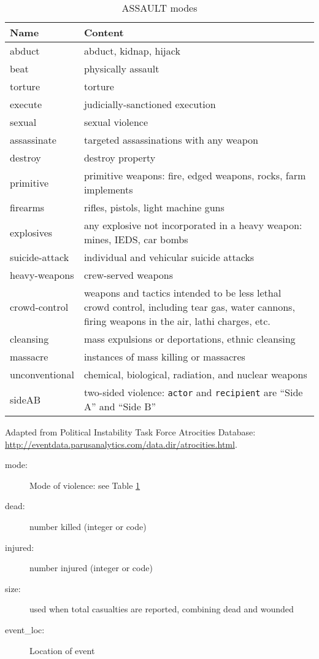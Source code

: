 \documentclass[11pt]{report}
\newcommand{\txt}[1]{\texttt{#1}}
\begin{document}
\begin{table}[htp]
\caption{ASSAULT modes}
\begin{center}
\begin{tabular}{|p{}|p{}|}
\hline
Name & Content \\
\hline
abduct & abduct, kidnap, hijack \\
beat & physically assault \\
torture & torture \\
execute & judicially-sanctioned execution \\
sexual & sexual violence\\
assassinate & targeted assassinations with any weapon \\
destroy & destroy property \\
primitive & primitive weapons: fire, edged weapons, rocks, farm implements \\
firearms & rifles, pistols, light machine guns\\
explosives & any explosive not incorporated in a heavy weapon: mines, IEDS, car bombs \\
suicide-attack & individual and vehicular suicide attacks \\
heavy-weapons & crew-served weapons  \\
crowd-control & weapons and tactics intended to be less lethal crowd control, including tear gas, water cannons, firing weapons in the air, lathi charges, etc. \\
cleansing & mass expulsions or deportations, ethnic cleansing  \\
massacre & instances of mass killing or massacres  \\
unconventional & chemical, biological, radiation, and nuclear weapons  \\
sideAB & two-sided violence: \txt{actor} and \txt{recipient} are ``Side A'' and ``Side B'' \\
\hline
\end{tabular}
\end{center}
\label{tab:violmode}
\raggedright{Adapted from Political Instability Task Force Atrocities Database: \url{http://eventdata.parusanalytics.com/data.dir/atrocities.html}}. 
\end{table}%

\begin{description}
	\item[mode:] Mode of violence: see Table \ref{tab:violmode} 
	\item[dead:]  number killed (integer or code) 
	\item[injured:] number injured (integer or code) 
	\item[size:] used when total casualties are reported, combining dead and wounded 
	\item[event\_loc:] Location of event 
\end{description}
\end{document}
